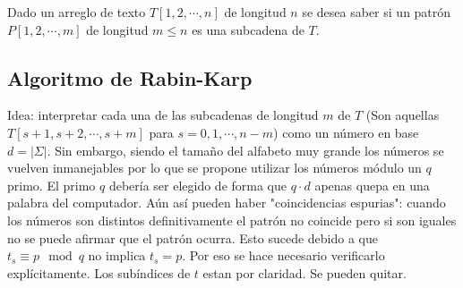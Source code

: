 Dado un arreglo de texto $T[1,2,\cdots ,n]$ de longitud $n$ se desea saber si un patr\'on $P[1,2,\cdots ,m]$ de longitud $m\leq n$ es una subcadena de $T$.
\subsection{Algoritmo de Rabin-Karp}
Idea: interpretar cada una de las subcadenas de longitud $m$ de $T$ (Son aquellas $T[s+1,s+2,\cdots ,s+m]$ para $s=0,1,\cdots ,n-m$) como un n\'umero en base $d=|\Sigma|$. Sin embargo, siendo el tama\~{n}o del alfabeto muy grande los n\'umeros se vuelven inmanejables por lo que se propone utilizar los n\'umeros m\'odulo un $q$ primo. El primo $q$ deber\'ia ser elegido de forma que $q\cdot d$ apenas quepa en una palabra del computador. A\'un as\'i pueden haber "coincidencias espurias": cuando los n\'umeros son distintos definitivamente el patr\'on no coincide pero si son iguales no se puede afirmar que el patr\'on ocurra. Esto sucede debido a que $t_s \equiv p \mod q$ no implica $t_s=p$. Por eso se hace necesario verificarlo expl\'icitamente.
Los sub\'indices de $t$ estan por claridad. Se pueden quitar.